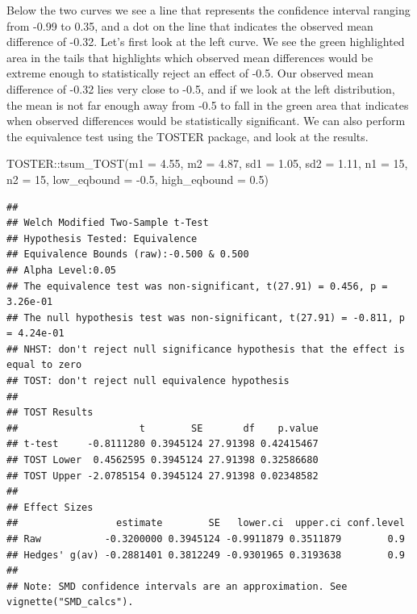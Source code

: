 \documentclass[
  oneside]{krantz}
\makeatletter
\newenvironment{Shaded}{\begin{snugshade}}{\end{snugshade}}
\newcommand{\AttributeTok}[1]{\textcolor[rgb]{0.61,0.61,0.61}{#1}}
\newcommand{\DecValTok}[1]{\textcolor[rgb]{0.06,0.06,0.06}{#1}}
\newcommand{\FloatTok}[1]{\textcolor[rgb]{0.06,0.06,0.06}{#1}}
\newcommand{\FunctionTok}[1]{\textcolor[rgb]{0,0,0}{#1}}
\newcommand{\NormalTok}[1]{#1}
\newcommand{\SpecialCharTok}[1]{\textcolor[rgb]{0,0,0}{#1}}
\newenvironment{kframe}{%
\medskip{}
\setlength{\fboxsep}{.8em}
 \def\at@end@of@kframe{}%
 \ifinner\ifhmode%
  \def\at@end@of@kframe{\end{minipage}}%
  \begin{minipage}{\columnwidth}%
 \fi\fi%
 \def\FrameCommand##1{\hskip\@totalleftmargin \hskip-\fboxsep
 \colorbox{shadecolor}{##1}\hskip-\fboxsep
     \hskip-\linewidth \hskip-\@totalleftmargin \hskip\columnwidth}%
 \MakeFramed {\advance\hsize-\width
   \@totalleftmargin\z@ \linewidth\hsize
   \@setminipage}}%
 {\par\unskip\endMakeFramed%
 \at@end@of@kframe}
\renewenvironment{Shaded}{\begin{kframe}}{\end{kframe}}
\makeatother
\begin{document}
Below the two curves we see a line that represents the confidence interval ranging from -0.99 to 0.35, and a dot on the line that indicates the observed mean difference of -0.32. Let's first look at the left curve. We see the green highlighted area in the tails that highlights which observed mean differences would be extreme enough to statistically reject an effect of -0.5. Our observed mean difference of -0.32 lies very close to -0.5, and if we look at the left distribution, the mean is not far enough away from -0.5 to fall in the green area that indicates when observed differences would be statistically significant. We can also perform the equivalence test using the TOSTER package, and look at the results.

\begin{Shaded}
\begin{Highlighting}[]
\NormalTok{TOSTER}\SpecialCharTok{::}\FunctionTok{tsum\_TOST}\NormalTok{(}\AttributeTok{m1 =} \FloatTok{4.55}\NormalTok{, }
                  \AttributeTok{m2 =} \FloatTok{4.87}\NormalTok{, }
                  \AttributeTok{sd1 =} \FloatTok{1.05}\NormalTok{, }
                  \AttributeTok{sd2 =} \FloatTok{1.11}\NormalTok{,}
                  \AttributeTok{n1 =} \DecValTok{15}\NormalTok{, }
                  \AttributeTok{n2 =} \DecValTok{15}\NormalTok{, }
                  \AttributeTok{low\_eqbound =} \SpecialCharTok{{-}}\FloatTok{0.5}\NormalTok{, }
                  \AttributeTok{high\_eqbound =} \FloatTok{0.5}\NormalTok{)}
\end{Highlighting}
\end{Shaded}

\begin{verbatim}
## 
## Welch Modified Two-Sample t-Test
## Hypothesis Tested: Equivalence
## Equivalence Bounds (raw):-0.500 & 0.500
## Alpha Level:0.05
## The equivalence test was non-significant, t(27.91) = 0.456, p = 3.26e-01
## The null hypothesis test was non-significant, t(27.91) = -0.811, p = 4.24e-01
## NHST: don't reject null significance hypothesis that the effect is equal to zero 
## TOST: don't reject null equivalence hypothesis
## 
## TOST Results 
##                     t        SE       df    p.value
## t-test     -0.8111280 0.3945124 27.91398 0.42415467
## TOST Lower  0.4562595 0.3945124 27.91398 0.32586680
## TOST Upper -2.0785154 0.3945124 27.91398 0.02348582
## 
## Effect Sizes 
##                 estimate        SE   lower.ci  upper.ci conf.level
## Raw           -0.3200000 0.3945124 -0.9911879 0.3511879        0.9
## Hedges' g(av) -0.2881401 0.3812249 -0.9301965 0.3193638        0.9
## 
## Note: SMD confidence intervals are an approximation. See vignette("SMD_calcs").
\end{verbatim}
\end{document}
